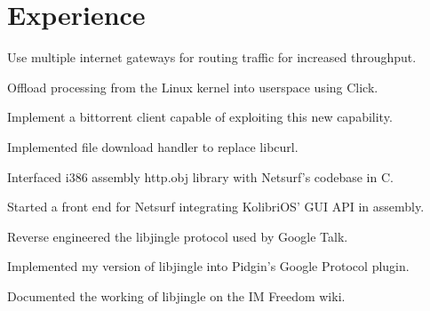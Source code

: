\documentclass[letterpaper]{deedy-resume} %
\begin{document}
\begin{minipage}[t]{0.66\textwidth} %
\section{Experience}
\vspace{\topsep} %
\begin{tightitemize}
\item Use multiple internet gateways for routing traffic for increased throughput.
\item Offload processing from the Linux kernel into userspace using Click.
\item Implement a bittorrent client capable of exploiting this new capability.
\end{tightitemize}
\sectionspace %
\begin{tightitemize}
\item Implemented file download handler to replace libcurl.
\item Interfaced i386 assembly http.obj library with Netsurf's codebase in C.
\item Started a front end for Netsurf integrating KolibriOS' GUI API in assembly.
\end{tightitemize}
\sectionspace %
\begin{tightitemize}
\item Reverse engineered the libjingle protocol used by Google Talk.
\item Implemented my version of libjingle into Pidgin's Google Protocol plugin.
\item Documented the working of libjingle on the IM Freedom wiki.
\end{tightitemize}
\sectionspace %

\end{minipage}
\end{document}
